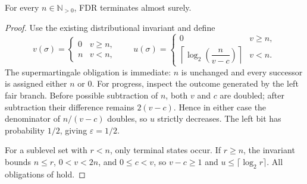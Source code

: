 \begin{theorem}
\label{thm:fdr}
For every $n\in\mathbb{N}_{>0}$, FDR terminates almost surely.
\end{theorem}
\begin{proof}
Use the existing distributional invariant and define
\[
 v(\sigma)=
 \begin{cases}0&v\ge n,\\ n&v<n,\end{cases}
 \qquad
 u(\sigma)=
 \begin{cases}
 0&v\ge n,\\
 \left\lceil\log_2\!\left(\dfrac{n}{v-c}\right)\right\rceil&v<n.
 \end{cases}
\]
The supermartingale obligation is immediate: $n$ is unchanged and every successor is assigned either $n$ or $0$. For progress, inspect the outcome generated by the left fair branch. Before possible subtraction of $n$, both $v$ and $c$ are doubled; after subtraction their difference remains $2(v-c)$. Hence in either case the denominator of $n/(v-c)$ doubles, so $u$ strictly decreases. The left bit has probability $1/2$, giving $\varepsilon=1/2$.

For a sublevel set with $r<n$, only terminal states occur. If $r\ge n$, the invariant bounds $n\le r$, $0<v<2n$, and $0\le c<v$, so $v-c\ge1$ and $u\le\lceil\log_2 r\rceil$. All obligations of  hold.
\end{proof}

